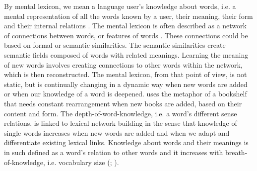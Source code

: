 \documentclass[output=paper,colorlinks,citecolor=brown,nonflat]{langsci/langscibook}
\begin{document}
By mental lexicon, we mean a language user’s knowledge about words, i.e. a mental representation of all the words known by a user, their meaning, their form and their internal relations \citep{Aitchison2012}. The mental lexicon is often described as a network of connections between words, or features of words \citep{Aitchison2012}. These connections could be based on formal or semantic similarities. The semantic similarities create semantic fields composed of words with related meanings. Learning the meaning of new words involves creating connections to other words within the network, which is then reconstructed. The mental lexicon, from that point of view, is not static, but is continually changing in a dynamic way when new words are added or when our knowledge of a word is deepened. \citet[209--210]{Aitchison2012} uses the metaphor of a bookshelf that needs constant rearrangement when new books are added, based on their content and form. The depth-of-word-knowledge, i.e. a word’s different sense relations, is linked to lexical network building in the sense that knowledge of single words increases when new words are added and when we adapt and differentiate existing lexical links. Knowledge about words and their meanings is in such defined as a word’s relation to other words and it increases with breath-of-knowledge, i.e. vocabulary size (\citealt[222]{HaastrupHenriksen2000}; \citealt{Nation2001, Read2004}).
\end{document}
